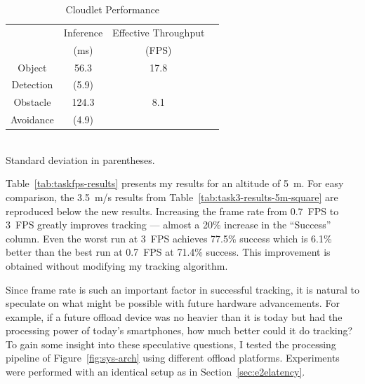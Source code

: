 \begin{table}
        \centering
        \begin{tabular}{|c|c|c|c|}
                \hline
                & Inference & Effective Throughput \\
                & (ms) & (FPS) \\
                \hline
                Object & 56.3 & 17.8  \\
                Detection & (5.9) &  \\
                \hline
                Obstacle & 124.3 & 8.1 \\
                Avoidance & (4.9) &  \\
                \hline
        \end{tabular}
        \begin{captext}
                \centering \\[0.1cm] Standard deviation in parentheses. \\
        \end{captext}
        \caption{Cloudlet Performance}
        \label{tab:cloudlet-perf}
\end{table}

Table~\ref{tab:taskfps-results} presents my results for an altitude of
5~m.  For easy comparison, the 3.5~m/s results from
Table~\ref{tab:task3-results-5m-square} are reproduced below the new
results.  Increasing the frame rate from 0.7~FPS to 3~FPS greatly
improves tracking --- almost a 20\% increase in the ``Success''
column.  Even the worst run at 3~FPS achieves 77.5\% success which is
6.1\% better than the best run at 0.7~FPS at 71.4\%
success.  This improvement is obtained without modifying my tracking
algorithm. 

Since frame rate is such an important factor in successful tracking,
it is natural to speculate on what might be possible with future
hardware advancements.  For example, if a future offload device was no heavier
than it is today but had the processing power of today's smartphones,
how much better could it do tracking?  To gain some insight into these
speculative questions, I tested the processing pipeline of
Figure~\ref{fig:sys-arch} using different offload platforms.  Experiments were performed with an identical setup as in Section~\ref{sec:e2elatency}.


